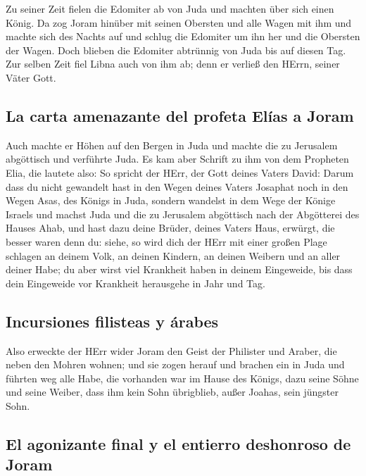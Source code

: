  Zu seiner Zeit fielen die Edomiter ab von Juda und
machten über sich einen König.  Da zog Joram hinüber mit
seinen Obersten und alle Wagen mit ihm und machte sich des Nachts auf
und schlug die Edomiter um ihn her und die Obersten der Wagen.
 Doch blieben die Edomiter abtrünnig von Juda bis auf
diesen Tag. Zur selben Zeit fiel Libna auch von ihm ab; denn er verließ
den HErrn, seiner Väter Gott.

\hypertarget{la-carta-amenazante-del-profeta-eluxedas-a-joram}{%
\subsection{La carta amenazante del profeta Elías a
Joram}\label{la-carta-amenazante-del-profeta-eluxedas-a-joram}}

 Auch machte er Höhen auf den Bergen in Juda und machte
die zu Jerusalem abgöttisch und verführte Juda.  Es kam
aber Schrift zu ihm von dem Propheten Elia, die lautete also: So spricht
der HErr, der Gott deines Vaters David: Darum dass du nicht gewandelt
hast in den Wegen deines Vaters Josaphat noch in den Wegen Asas, des
Königs in Juda,  sondern wandelst in dem Wege der Könige
Israels und machst Juda und die zu Jerusalem abgöttisch nach der
Abgötterei des Hauses Ahab, und hast dazu deine Brüder, deines Vaters
Haus, erwürgt, die besser waren denn du:  siehe, so wird
dich der HErr mit einer großen Plage schlagen an deinem Volk, an deinen
Kindern, an deinen Weibern und an aller deiner Habe;  du
aber wirst viel Krankheit haben in deinem Eingeweide, bis dass dein
Eingeweide vor Krankheit herausgehe in Jahr und Tag.

\hypertarget{incursiones-filisteas-y-uxe1rabes}{%
\subsection{Incursiones filisteas y
árabes}\label{incursiones-filisteas-y-uxe1rabes}}

 Also erweckte der HErr wider Joram den Geist der
Philister und Araber, die neben den Mohren wohnen;  und
sie zogen herauf und brachen ein in Juda und führten weg alle Habe, die
vorhanden war im Hause des Königs, dazu seine Söhne und seine Weiber,
dass ihm kein Sohn übrigblieb, außer Joahas, sein jüngster Sohn.

\hypertarget{el-agonizante-final-y-el-entierro-deshonroso-de-joram}{%
\subsection{El agonizante final y el entierro deshonroso de
Joram}\label{el-agonizante-final-y-el-entierro-deshonroso-de-joram}}

